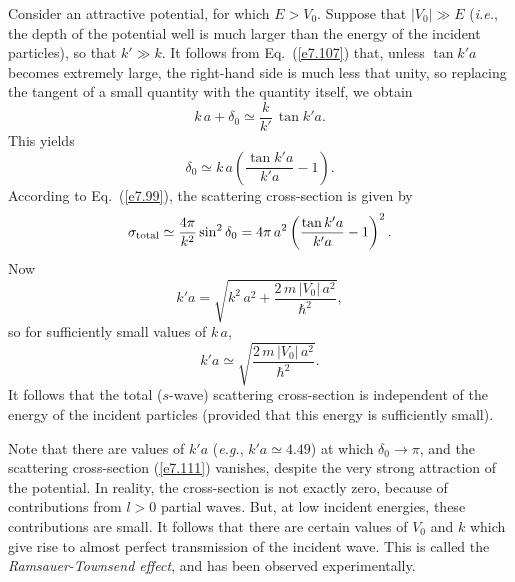 Consider an attractive potential, for which $E>V_0$. Suppose that 
$|V_0|\gg E$ ({\em i.e.}, the depth of the potential well is much larger than
the energy of the incident particles), so that $k' \gg k$. It follows
from Eq.~(\ref{e7.107}) that, unless $\tan k'a$ becomes extremely large, the right-hand side is much less that unity, so replacing the tangent of a
small quantity with the quantity itself, we obtain
\begin{equation}
k\,a + \delta_0 \simeq \frac{k}{k'}\,\tan k'a.
\end{equation}
This yields
\begin{equation}
\delta_0 \simeq k\,a \left( \frac{\tan k'a}{k'a} -1\right).
\end{equation}
According to Eq.~(\ref{e7.99}), the scattering cross-section is given by
\begin{equation}\label{e7.111}
\sigma_{\rm total} \simeq \frac{4\pi}{k^2} \sin^2\delta_0
=4\pi \,a^2\left(\frac{\tan k'a}{k'a} -1\right)^2.
\end{equation}
Now
\begin{equation}\label{e7.112}
k'a = \sqrt{ k^2 \,a^2 + \frac{2 \,m \,|V_0|\, a^2}{\hbar^2}},
\end{equation}
so for sufficiently small values of $k\,a$,
\begin{equation}
k' a \simeq \sqrt{\frac{2\, m \,|V_0|\, a^2}{\hbar^2}}.
\end{equation}
It follows that the total ($s$-wave) scattering cross-section is independent
of the energy of the incident particles (provided that this energy is
sufficiently small). 

Note that there are values of $k'a$ ({\em e.g.}, $k'a\simeq 4.49$) at which
$\delta_0\rightarrow \pi$, and 
the scattering cross-section (\ref{e7.111}) vanishes, despite the very strong
attraction of the potential. In reality, the cross-section is not
exactly zero, because of contributions from $l>0$ partial waves. But,
at low incident energies, these contributions are small. It follows that
there are certain values of $V_0$ and $k$ which give rise to almost perfect 
transmission of the incident wave. This is called the {\em Ramsauer-Townsend
effect}, and has been observed experimentally. 


